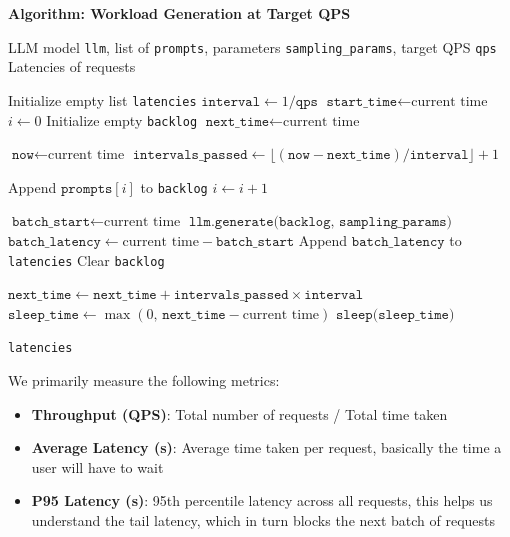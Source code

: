 \noindent\textbf{Algorithm: Workload Generation at Target QPS}
\begin{algorithmic}[1]
\Require LLM model \texttt{llm}, list of \texttt{prompts}, parameters \texttt{sampling\_params}, target QPS \texttt{qps}
\Ensure Latencies of requests

\State Initialize empty list \texttt{latencies}
\State $\texttt{interval} \gets 1 / \texttt{qps}$
\State $\texttt{start\_time} \gets \text{current time}$
\State $i \gets 0$
\State Initialize empty \texttt{backlog}
\State $\texttt{next\_time} \gets \text{current time}$

    \State $\texttt{now} \gets \text{current time}$
    \State $\texttt{intervals\_passed} \gets \lfloor (\texttt{now} - \texttt{next\_time}) / \texttt{interval} \rfloor + 1$
    
            \State Append $\texttt{prompts}[i]$ to \texttt{backlog}
            \State $i \gets i + 1$
        \EndIf
    \EndFor

        \State $\texttt{batch\_start} \gets \text{current time}$
        \State $\texttt{llm.generate(backlog, sampling\_params)}$
        \State $\texttt{batch\_latency} \gets \text{current time} - \texttt{batch\_start}$
            \State Append $\texttt{batch\_latency}$ to \texttt{latencies}
        \EndFor
        \State Clear \texttt{backlog}
    \EndIf

    \State $\texttt{next\_time} \gets \texttt{next\_time} + \texttt{intervals\_passed} \times \texttt{interval}$
    \State $\texttt{sleep\_time} \gets \max(0,\, \texttt{next\_time} - \text{current time})$
    \State $\texttt{sleep(sleep\_time)}$
\EndWhile

\State \Return \texttt{latencies}
\end{algorithmic}


\vspace{5pt}

We primarily measure the following metrics:
\begin{itemize}
    \item \textbf{Throughput (QPS)}: Total number of requests / Total time taken
    \item \textbf{Average Latency (s)}: Average time taken per request, basically the time a user will have to wait
    \item \textbf{P95 Latency (s)}: 95th percentile latency across all requests, this helps us understand the tail latency, which in turn blocks the next batch of requests
\end{itemize}

